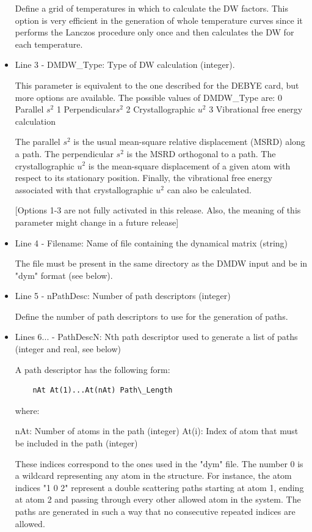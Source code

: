 \documentclass[11pt,oneside]{report} %
\begin{document}
\begin{latexonly}
\begin{itemize}
  Define a grid of temperatures in which to calculate the DW factors. This
  option is very efficient in the generation of whole temperature curves since
  it performs the Lanczos procedure only once and then calculates the DW for
  each temperature.

\item Line  3 - DMDW\_Type: Type of DW calculation (integer).

  This parameter is equivalent to the one described for the DEBYE card,
  but more options are available.
  The possible values of DMDW\_Type are:
	0	Parallel $s^{2}$
	1	Perpendicular$s^{2}$
	2	Crystallographic $u^{2}$
	3	Vibrational free energy calculation
	
  The parallel $s^{2}$ is the usual mean-square relative displacement (MSRD) along a
  path. The perpendicular $s^{2}$ is the MSRD orthogonal to a path. The
  crystallographic $u^{2}$ is the mean-square displacement of a given atom with
  respect to its stationary position. Finally, the vibrational free energy
  associated with that crystallographic $u^{2}$ can also be calculated.

  [Options 1-3 are not fully activated in this release. Also, 
  the meaning of this parameter might change in a future release]

\item Line  4 - Filename: Name of file containing the dynamical matrix (string)

  The file must be present in the same directory as the DMDW input and be in
  "dym" format (see below).

\item Line  5 - nPathDesc: Number of path descriptors (integer)

  Define the number of path descriptors to use for the generation of paths.
  
\item Lines 6... - PathDescN: Nth path descriptor used to generate a list of paths
                        (integer and real, see below)

  A path descriptor has the following form:
\begin{verbatim}  
    nAt At(1)...At(nAt) Path\_Length
\end{verbatim}    
  where:
  
    nAt: Number of atoms in the path (integer)
    At(i): Index of atom that must be included in the path (integer)

		These indices correspond to the ones used in the "dym" file. The
		number 0 is a wildcard representing any atom in the structure.
		For instance, the atom indices "1 0 2" represent a double
		scattering paths starting at atom 1, ending at atom 2 and
		passing through every other allowed atom in the system. The
		paths are generated in such a way that no consecutive repeated
		indices are allowed.


\end{itemize}
\end{latexonly}
\end{document}
